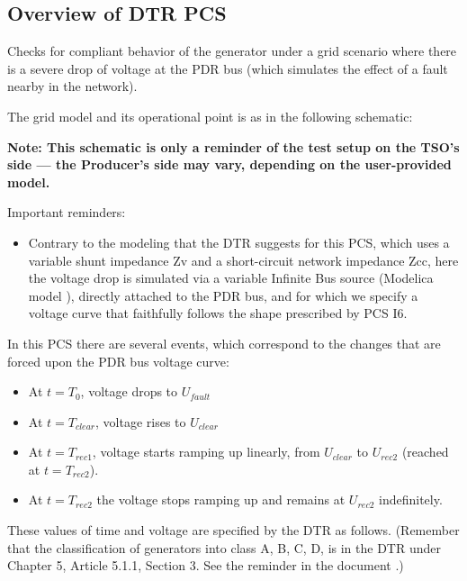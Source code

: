     \subsection{Overview of DTR PCS \DTRPcs}

    Checks for compliant behavior of the generator under a grid scenario where there is a
    severe drop of voltage at the PDR bus (which simulates the effect of a fault
    nearby in the network).

    The grid model and its operational point is as in the following schematic:
    \begin{center}
        
    \end{center}
    \begin{center}
        \small \textbf{Note: This schematic is only a reminder of the test setup on the TSO's
        side --- the Producer's side may vary, depending on the user-provided model.}
    \end{center}

    \noindent Important reminders:
    \begin{itemize}
        \item Contrary to the modeling that the DTR suggests for this PCS, which uses a
        variable shunt impedance Zv and a short-circuit network impedance Zcc, here
        the voltage drop is simulated via a variable Infinite Bus source (Modelica
        model ), directly attached to the PDR bus, and for
        which we specify a voltage curve that faithfully follows the shape prescribed
        by PCS I6.
    \end{itemize}

    In this PCS there are several events, which correspond to the changes that are
    forced upon the PDR bus voltage curve:
    \begin{itemize}
        \item At $t = T_{0}$, voltage drops to $U_{fault}$
        \item At $t = T_{clear}$, voltage rises to $U_{clear}$
        \item At $t = T_{rec1}$, voltage starts ramping up linearly, from $U_{clear}$ to
        $U_{rec2}$ (reached at $t = T_{rec2}$).
        \item At $t = T_{rec2}$ the voltage stops ramping up and remains at $U_{rec2}$
        indefinitely.
    \end{itemize}
    These values of time and voltage are specified by the DTR as follows. (Remember
    that the classification of generators into class A, B, C, D, is in the DTR under
    Chapter 5, Article 5.1.1, Section 3. See the reminder in the document
    .)

